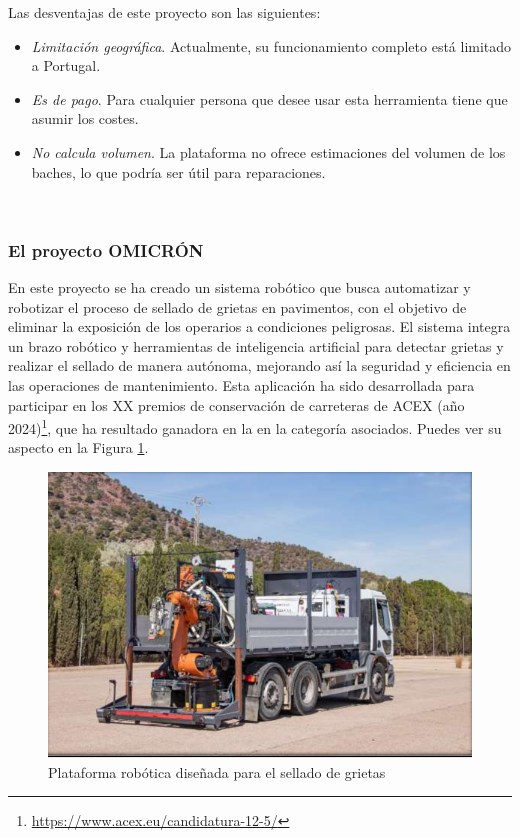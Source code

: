 Las desventajas de este proyecto son las siguientes:
\begin{itemize}
	\item \textit{Limitación geográfica}. Actualmente, su funcionamiento completo está limitado a Portugal.
	\item \textit{Es de pago}. Para cualquier persona que desee usar esta herramienta tiene que asumir los costes.
	\item \textit{No calcula volumen}. La plataforma no ofrece estimaciones del volumen de los baches, lo que podría ser útil para reparaciones.
	
\end{itemize}\


\subsubsection{El proyecto OMICRÓN}

En este proyecto se ha creado un sistema robótico que busca automatizar y robotizar el proceso de sellado de grietas en pavimentos, con el objetivo de eliminar la exposición de los operarios a condiciones peligrosas. El sistema integra un brazo robótico y herramientas de inteligencia artificial para detectar grietas y realizar el sellado de manera autónoma, mejorando así la seguridad y eficiencia en las operaciones de mantenimiento. Esta aplicación ha sido desarrollada para participar en los XX premios de conservación de carreteras de \ac{ACEX} (año 2024)\footnote{\url{https://www.acex.eu/candidatura-12-5/}}, que ha resultado ganadora en la en la categoría asociados. Puedes ver su aspecto en la Figura \ref{fig:omicron}.

\begin{figure} [h!]
	\begin{center}
		\includegraphics[width=16cm]{figs/omicron.png}
	\end{center}
	\caption{Plataforma robótica diseñada para el sellado de grietas}
	\label{fig:omicron}
\end{figure}

